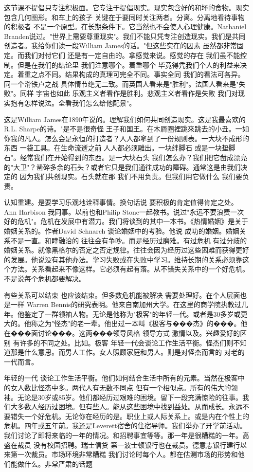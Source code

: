 这节课不提倡只专注积极面。它专注于提倡现实。现实包含好的和坏的食物。现实包含几何图形。和车上的孩子 关键在于要同时关注两者。分离。分离地看待事物的积极者 不是一个原型。在长期条件下。它当然也不会使人心理健康。Nathaniel Branden说过。"世界上需要尊重现实"。我们不能只凭专注创造现实。我们是共同创造者。我给你们读一段William James的话。"但这些实在的因素 虽然都非常固定。而我们对付它们 还是有一定自由的。拿感觉来说。感觉的存在 我们虽不能控制。但是在我们的结论里 我们注意哪个。着重哪个 毕竟得凭我们个人的利益来决定。着重之点不同。结果构成的真理可完全不同。事实全同 我们的看法可各异。同一个滑铁卢之战 具体情节绝无二致。而英国人看来是"胜利"。法国人看来是"失败"。同样 宇宙也如此 乐观主义者看作是胜利。悲观主义者看作是失败 我们对现实抱有怎样说法。全看我们怎么给他配景"。 

这是William James在1890年说的。理解我们如何共同创造现实。这是我最喜欢的R.L. Sharpe的诗。"是不是很奇怪 王子和国王。在木屑圈裡跳來跳去的小丑。一如你我的凡人。怎么会是永恒的打造者？人人都拿到了一份规则表。一大块不成形的东西 一袋工具。在生命流逝之前 人人都必须雕出。一块绊脚石 或是一块垫脚石"。经常我们在开始得到的东西。是一大块石头 我们怎么办？我们把它凿成漂亮的"大卫"？凿碎多余的石头？或者它只是我们通往成功的障碍。通常这是由我们决定的 因为我们共创现实。石头就在那 我们不用负责。但我们用它做什么 我们要负责。 

认知重建。是要学习乐观地诠释事情。换句话说 要积极的肯定值得肯定之处。Ann Harbison 我同事。以前也和Philip Stone一起教书。说过"永远不要浪费一次好的危机"。危机在发展中有潜力。我们将谈到的其中一本书。《热情婚姻》是关于婚姻关系的。作者David Schnarch 谈论婚姻中的考验。他说 成功的婚姻。婚姻关系不是一直。和睦融洽的 往往会有争吵。而是经历过磨难。有过危机 有过分歧的婚姻关系。就像黑格尔的否定之否定规律。往往会因为经历过这些困难而获得更好的发展。他说没有其他办法。学习失败或在失败中学习。维持长期的关系必须靠这个方法。关系看起来不像这样。它必须有起有落。从不错失关系中的一个好危机。不是说每个危机都要解决。 

有些关系可以结束 也应该结束。但多数危机能被解决 需要处理好。在个人层面也是一样 Warren Bennis的研究表明。他来自南加州大学。在这里的商学院执教过几年。他鉴定了一群领袖人物。无论是他称为"极客"的年轻一代。或者是30多岁或更大的。他称之为"怪杰"的老一辈。他出过一本叫《极客与���杰》的���。他在���面讨论���。这两���领导风格 领导方式 激情以及。兴趣爱好的区别 有许多的不同之处。比如。极客 年轻一代会谈论工作生活平衡。怪杰们则不知道那是什么意思。而男人工作。女人照顾家庭和男人。则是对怪杰而言的 对老的一代而言。 

年轻的一代 谈论工作生活平衡。他们如何结合生活中所有的元素。当然在极客中的女人数比怪杰中多。两代人有无数不同点 但有一个相似点。所有的伟大的领袖。无论是30岁或85岁。他们都经历过艰难的困境。留下一段充满惊险的往事。我们大多数人经历过困境。但有些人。能从这些困境中找到益处。从而成长。永远不要错失一个好危机。无论你在经历的是。职业上或人际关系上。或是内在个性上的危机。四年或五年前。我还是Leverett宿舍的住宿导师。我们举办了开学前活动。我们讨论了即将来临的一年的情况。和招聘事宜等等。那一年是很糟糕的一年。高盛在裁员 没有校园招聘。瑞士信贷 第一波士顿银行也在裁员。德意志银行建行以来第一次裁员。市场环境非常糟糕 我们讨论时每个人。都在估测市场的形势和他们能做什么。非常严肃的话题 

